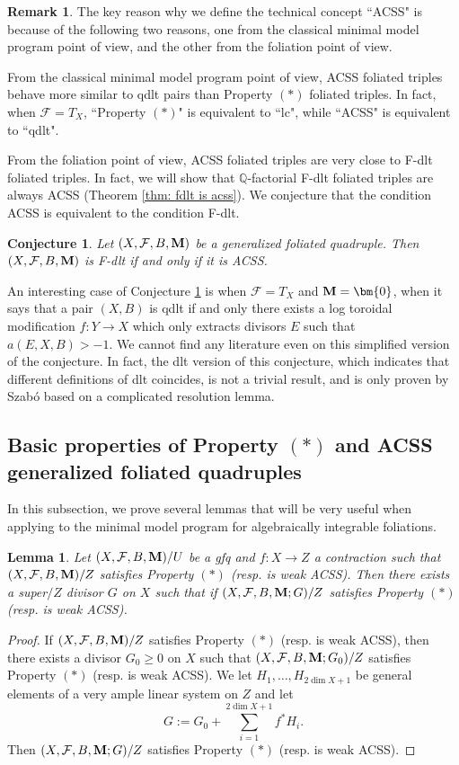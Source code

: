 \documentclass[11pt]{amsart}
\numberwithin{equation}{section}
\newcommand{\Mm}{{\bf{M}}}
\newcommand{\Qq}{\mathbb{Q}}
\newcommand{\Ff}{\mathcal{F}}
\newtheorem{conj}[thm]{Conjecture}
\newtheorem{lem}[thm]{Lemma}
\theoremstyle{definition}
\theoremstyle{definition}
\newtheorem{rem}[thm]{Remark}
\theoremstyle{definition}
\begin{document}
\begin{rem}
    The key reason why we define the technical concept ``ACSS" is because of the following two reasons, one from the classical minimal model program point of view, and the other from the foliation point of view.
    
    From the classical minimal model program point of view, ACSS foliated triples behave more similar to qdlt pairs than Property $(*)$ foliated triples. In fact, when $\Ff=T_X$, ``Property $(*)$" is equivalent to ``lc", while ``ACSS" is equivalent to ``qdlt".
    
    From the foliation point of view, ACSS foliated triples are very close to F-dlt foliated triples. In fact, we will show that $\Qq$-factorial F-dlt foliated triples are always ACSS (Theorem \ref{thm: fdlt is acss}). We conjecture that the condition ACSS is equivalent to the condition F-dlt.
\end{rem}

\begin{conj}\label{conj: fdlt equivalent to acss}
    Let $(X,\Ff,B,\Mm)$ be a generalized foliated quadruple. Then $(X,\Ff,B,\Mm)$ is F-dlt if and only if it is ACSS.
\end{conj}
An interesting case of Conjecture \ref{conj: fdlt equivalent to acss} is when $\Ff=T_X$ and $\Mm=\bm{0}$, when it says that a pair $(X,B)$ is qdlt if and only there exists a log toroidal modification $f: Y\rightarrow X$ which only extracts divisors $E$ such that $a(E,X,B)>-1$. We cannot find any literature even on this simplified version of the conjecture. In fact, the dlt version of this conjecture, which indicates that different definitions of dlt coincides, is not a trivial result, and is only proven by Szab\'o \cite{Sza94} based on a complicated resolution lemma.



\subsection{Basic properties of Property \texorpdfstring{$(*)$}{} and ACSS generalized foliated quadruples} In this subsection, we prove several lemmas that will be very useful when applying to the minimal model program for algebraically integrable foliations.


\begin{lem}\label{lem: weak acss can be super}
    Let $(X,\Ff,B,\Mm)/U$ be a gfq and $f: X\rightarrow Z$ a contraction such that $(X,\Ff,B,\Mm)/Z$ satisfies Property $(*)$ (resp. is weak ACSS). Then there exists a super$/Z$ divisor $G$ on $X$ such that if $(X,\Ff,B,\Mm;G)/Z$ satisfies Property $(*)$ (resp. is weak ACSS).
\end{lem}
\begin{proof}
If $(X,\Ff,B,\Mm)/Z$ satisfies Property $(*)$ (resp. is weak ACSS), then there exists a divisor $G_0\geq 0$ on $X$ such that $(X,\Ff,B,\Mm;G_0)/Z$ satisfies Property $(*)$ (resp. is weak ACSS). We let $H_1,\dots,H_{2\dim X+1}$ be general elements of a very ample linear system on $Z$ and let $$G:=G_0+\sum_{i=1}^{2\dim X+1}f^*H_i.$$ 
Then $(X,\Ff,B,\Mm;G)/Z$ satisfies Property $(*)$ (resp. is weak ACSS).
\end{proof}
\end{document}
